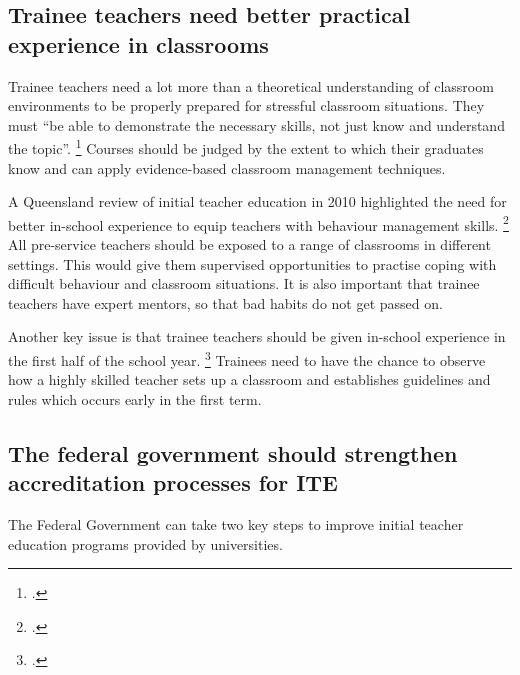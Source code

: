 \documentclass[FrontPage]{grattan}
\begin{document}
\subsection{Trainee teachers need better practical experience in classrooms}\label{subsec:practical-experience-classrooms}
Trainee teachers need a lot more than a theoretical understanding of classroom environments to be properly prepared for stressful classroom situations. They must “be able to demonstrate the necessary skills, not just know and understand the topic”.%
    \footcite[][11]{Caldwell2010ReviewTeacherEducation}
Courses should be judged by the extent to which their graduates know and can apply evidence-based classroom management techniques.

A Queensland review of initial teacher education in 2010 highlighted the need for better in-school experience to equip teachers with behaviour management skills.%
    \footcite{Caldwell2010ReviewTeacherEducation}
All pre-service teachers should be exposed to a range of classrooms in different settings. This would give them supervised opportunities to practise coping with difficult behaviour and classroom situations. It is also important that trainee teachers have expert mentors, so that bad habits do not get passed on.

Another key issue is that trainee teachers should be given in-school experience in the first half of the school year.%
    \footcites{Ingvarson2014BestPracticeTeacher}{Oliver2007EffectiveClassroomManagement} %
Trainees need to have the chance to observe how a highly skilled teacher sets up a classroom and establishes guidelines and rules which occurs early in the first term.

\subsection{The federal government should strengthen accreditation processes for ITE}\label{subsec:what-government-leaders}
The Federal Government can take two key steps to improve initial teacher education programs provided by universities. 
\end{document}
